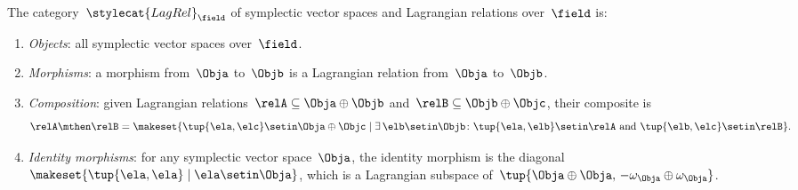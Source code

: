 {\begin{ctdefinition}
    The category~$\stylecat{LagRel}_\field$ of symplectic vector spaces and Lagrangian relations over~$\field$ is:
    \begin{enumerate}
        \item \emph{Objects}: all symplectic vector spaces over~$\field$.
        \item \emph{Morphisms}: a morphism from~$\Obja$ to~$\Objb$ is a Lagrangian relation from~$\Obja$ to~$\Objb$.
        \item \emph{Composition}: given Lagrangian relations~$\relA \subseteq \Obja \oplus \Objb$ and~$\relB \subseteq \Objb \oplus \Objc$, their composite is
              \begin{equation}
                  \relA \mthen \relB = \makeset{ \tup{\ela, \elc} \setin \Obja \oplus \Objc \mid \exists\, \elb \setin \Objb \colon \tup{\ela, \elb} \setin \relA \text{ and } \tup{\elb, \elc} \setin \relB }.
              \end{equation}
        \item \emph{Identity morphisms}: for any symplectic vector space~$\Obja$, the identity morphism is the diagonal~$\makeset{ \tup{\ela, \ela} \mid \ela \setin \Obja }$, which is a Lagrangian subspace of~$\tup{\Obja \oplus \Obja,\, -\omega_\Obja \oplus \omega_\Obja}$.
    \end{enumerate}
\end{ctdefinition}


}

